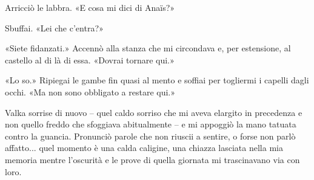 Arricciò le labbra. «E cosa mi dici di Anaïs?»

Sbuffai. «Lei che c'entra?»

«Siete fidanzati.» Accennò alla stanza che mi circondava e, per
estensione, al castello al di là di essa. «Dovrai tornare qui.»

«Lo so.» Ripiegai le gambe fin quasi al mento e soffiai per togliermi i
capelli dagli occhi. «Ma non sono obbligato a restare qui.»

Valka sorrise di nuovo -- quel caldo sorriso che mi aveva elargito in
precedenza e non quello freddo che sfoggiava abitualmente -- e mi
appoggiò la mano tatuata contro la guancia. Pronunciò parole che non
riuscii a sentire, o forse non parlò affatto... quel momento è una calda
caligine, una chiazza lasciata nella mia memoria mentre l'oscurità e le
prove di quella giornata mi trascinavano via con loro.

